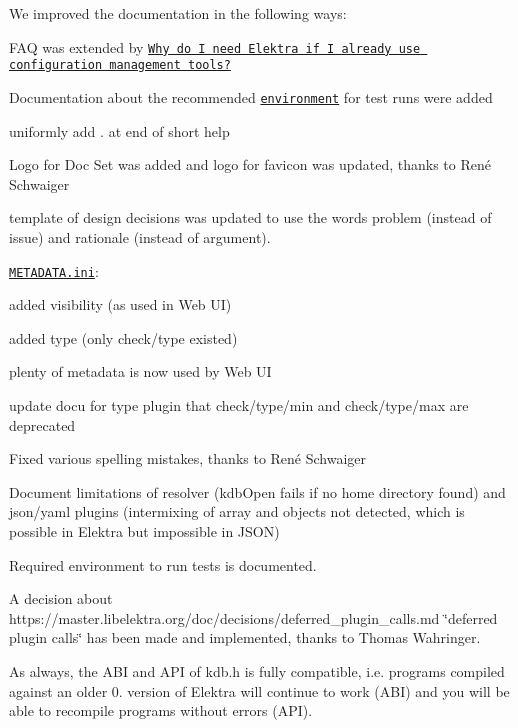 We improved the documentation in the following ways\+:


\begin{DoxyItemize}
\item F\+AQ was extended by \href{https://www.libelektra.org/docgettingstarted/faq}{\tt Why do I need Elektra if I already use configuration management tools?}
\item Documentation about the recommended \href{https://www.libelektra.org/devgettingstarted/testing}{\tt environment} for test runs were added
\item uniformly add {\ttfamily .} at end of short help
\item Logo for Doc Set was added and logo for favicon was updated, thanks to René Schwaiger
\item template of design decisions was updated to use the words problem (instead of issue) and rationale (instead of argument).
\item \href{https://www.libelektra.org/docgettingstarted/meta-specification}{\tt M\+E\+T\+A\+D\+A\+T\+A.\+ini}\+:
\begin{DoxyItemize}
\item added visibility (as used in Web UI)
\item added type (only check/type existed)
\item plenty of metadata is now used by Web UI
\end{DoxyItemize}
\item update docu for type plugin that {\ttfamily check/type/min} and {\ttfamily check/type/max} are deprecated
\item Fixed various spelling mistakes, thanks to René Schwaiger
\item Document limitations of resolver (kdb\+Open fails if no home directory found) and json/yaml plugins (intermixing of array and objects not detected, which is possible in Elektra but impossible in J\+S\+ON)
\item Required environment to run tests is documented.
\item A decision about https\+://master.libelektra.\+org/doc/decisions/deferred\+\_\+plugin\+\_\+calls.md \char`\"{}deferred plugin calls\char`\"{} has been made and implemented, thanks to Thomas Wahringer.
\end{DoxyItemize}

As always, the A\+BI and A\+PI of kdb.\+h is fully compatible, i.\+e. programs compiled against an older 0. version of Elektra will continue to work (A\+BI) and you will be able to recompile programs without errors (A\+PI).

